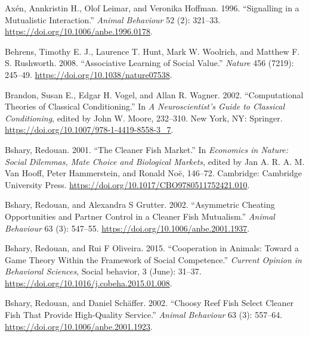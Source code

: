 \documentclass[
  12pt,
]{article}
\newlength{\cslhangindent}
\newlength{\cslentryspacingunit} %
\newenvironment{CSLReferences}[2] %
 {%
  \setlength{\parindent}{0pt}
  \ifodd #1
  \let\oldpar\par
  \def\par{\hangindent=\cslhangindent\oldpar}
  \fi
  \setlength{\parskip}{#2\cslentryspacingunit}
 }%
 {}
\begin{document}
\hypertarget{refs}{}
\begin{CSLReferences}{1}{0}
\leavevmode{}%
Axén, Annkristin H., Olof Leimar, and Veronika Hoffman. 1996.
{``Signalling in a Mutualistic Interaction.''} \emph{Animal Behaviour}
52 (2): 321--33. \url{https://doi.org/10.1006/anbe.1996.0178}.

\leavevmode{}%
Behrens, Timothy E. J., Laurence T. Hunt, Mark W. Woolrich, and Matthew
F. S. Rushworth. 2008. {``Associative Learning of Social Value.''}
\emph{Nature} 456 (7219): 245--49.
\url{https://doi.org/10.1038/nature07538}.

\leavevmode{}%
Brandon, Susan E., Edgar H. Vogel, and Allan R. Wagner. 2002.
{``Computational {Theories} of {Classical} {Conditioning}.''} In \emph{A
{Neuroscientist}'s {Guide} to {Classical} {Conditioning}}, edited by
John W. Moore, 232--310. New York, NY: Springer.
\url{https://doi.org/10.1007/978-1-4419-8558-3_7}.

\leavevmode{}%
Bshary, Redouan. 2001. {``The Cleaner Fish Market.''} In \emph{Economics
in {Nature}: {Social} {Dilemmas}, {Mate} {Choice} and {Biological}
{Markets}}, edited by Jan A. R. A. M. Van Hooff, Peter Hammerstein, and
Ronald Noë, 146--72. Cambridge: Cambridge University Press.
\url{https://doi.org/10.1017/CBO9780511752421.010}.

\leavevmode{}%
Bshary, Redouan, and Alexandra S Grutter. 2002. {``Asymmetric Cheating
Opportunities and Partner Control in a Cleaner Fish Mutualism.''}
\emph{Animal Behaviour} 63 (3): 547--55.
\url{https://doi.org/10.1006/anbe.2001.1937}.

\leavevmode{}%
Bshary, Redouan, and Rui F Oliveira. 2015. {``Cooperation in Animals:
Toward a Game Theory Within the Framework of Social Competence.''}
\emph{Current Opinion in Behavioral Sciences}, Social behavior, 3
(June): 31--37. \url{https://doi.org/10.1016/j.cobeha.2015.01.008}.

\leavevmode{}%
Bshary, Redouan, and Daniel Schäffer. 2002. {``Choosy Reef Fish Select
Cleaner Fish That Provide High-Quality Service.''} \emph{Animal
Behaviour} 63 (3): 557--64.
\url{https://doi.org/10.1006/anbe.2001.1923}.


\end{CSLReferences}
\end{document}
